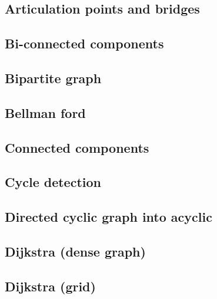 \subsection{Articulation points and bridges}
\raggedbottom
\hrulefill
\subsection{Bi-connected components}
\raggedbottom
\hrulefill
\subsection{Bipartite graph}
\raggedbottom
\hrulefill
\subsection{Bellman ford}
\raggedbottom
\hrulefill
\subsection{Connected components}
\raggedbottom
\hrulefill
\subsection{Cycle detection}
\raggedbottom
\hrulefill
\subsection{Directed cyclic graph into acyclic}
\raggedbottom
\hrulefill
\subsection{Dijkstra (dense graph)}
\raggedbottom
\hrulefill
\subsection{Dijkstra (grid)}
\raggedbottom
\hrulefill
